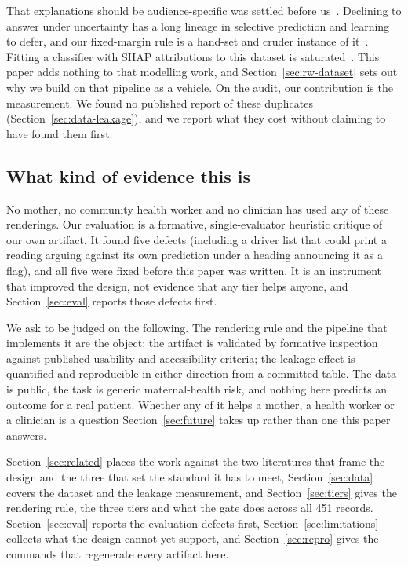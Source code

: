 That explanations should be audience-specific was settled before
us~\citep{arya2019explanation,imrie2023multiple,kim2024stakeholder}.
Declining to answer under uncertainty has a long lineage in selective
prediction and learning to defer, and our fixed-margin rule is a hand-set and
cruder instance of it~\citep{hendrickx2024reject,mozannar2020consistent}.
Fitting a classifier with SHAP attributions to this dataset is
saturated~\citep{mamun2025identification, maisoon2026stratification}. This
paper adds nothing to that modelling work, and Section~\ref{sec:rw-dataset}
sets out why we build on that pipeline as a vehicle. On the audit, our
contribution is the measurement. We found no published report of these
duplicates (Section~\ref{sec:data-leakage}), and we report what they cost
without claiming to have found them first.

\subsection{What kind of evidence this is}

No mother, no community health worker and no clinician has used any of these
renderings. Our evaluation is a formative, single-evaluator heuristic critique
of our own artifact. It found five defects (including a driver list that could
print a reading arguing against its own prediction under a heading announcing
it as a flag), and all five were fixed before this paper was written. It is an
instrument that improved the design, not evidence that any tier helps anyone,
and Section~\ref{sec:eval} reports those defects first.

We ask to be judged on the following. The rendering rule and the pipeline that
implements it are the object; the artifact is validated by formative
inspection against published usability and accessibility criteria; the leakage
effect is quantified and reproducible in either direction from a committed
table. The data is public, the task is generic maternal-health risk, and
nothing here predicts an outcome for a real patient. Whether any of it helps a
mother, a health worker or a clinician is a question Section~\ref{sec:future}
takes up rather than one this paper answers.

Section~\ref{sec:related} places the work against the two literatures that
frame the design and the three that set the standard it has to meet,
Section~\ref{sec:data}
covers the dataset and the leakage measurement, and Section~\ref{sec:tiers}
gives the rendering rule, the three tiers and what the gate does across all 451
records. Section~\ref{sec:eval} reports
the evaluation defects first, Section~\ref{sec:limitations} collects what the
design cannot yet support, and Section~\ref{sec:repro} gives the commands that
regenerate every artifact here.
